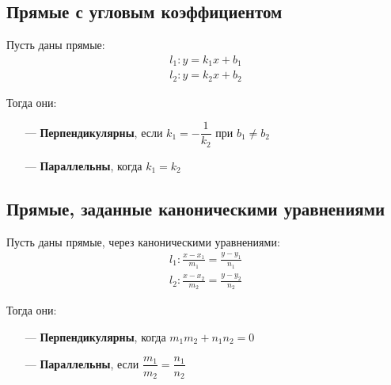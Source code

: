 \documentclass[a4paper,12pt]{extbook}
\theoremstyle{named}
\theoremstyle{named}
\begin{document}
\subsection*{Прямые с угловым коэффициентом}
Пусть даны прямые:
\begin{gather*}
    l_1: y = k_1x + b_1 \\
    l_2: y = k_2x + b_2
\end{gather*}

Тогда они:
\begin{itemize}
    \item[—]{\textbf{Перпендикулярны}, если \(k_1 = -\dfrac{1}{k_2}\) при \(b_1 \neq b_2\)}
    \item[—]{\textbf{Параллельны}, когда \(k_1 = k_2\)}
\end{itemize}

\subsection*{Прямые, заданные каноническими уравнениями}
Пусть даны прямые, через каноническими уравнениями:
\begin{gather*}
    l_1: \frac{x - x_1}{m_1} = \frac{y - y_1}{n_1} \\
    l_2: \frac{x - x_2}{m_2} = \frac{y - y_2}{n_2}
\end{gather*}

Тогда они:
\begin{itemize}
    \item[—]{\textbf{Перпендикулярны}, когда \(m_1m_2 + n_1n_2 = 0\)}
    \item[—]{\textbf{Параллельны}, если \(\dfrac{m_1}{m_2} = \dfrac{n_1}{n_2}\)}
\end{itemize}




\end{document}

